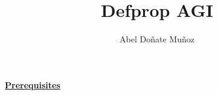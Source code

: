 \documentclass[9pt,leqno,landscape,twocolumn]{extarticle}
\title{Defprop AGI}
\author{Abel Doñate Muñoz}
\date{}
\begin{document}

\textbf{\underline{Prerequisites}}


\end{document}

